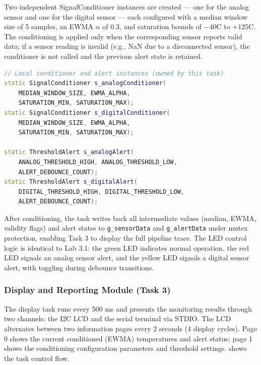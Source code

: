 Two independent SignalConditioner instances are created --- one for the analog sensor and one for the digital sensor --- each configured with a median window size of 5 samples, an EWMA $\alpha$ of 0.3, and saturation bounds of $-40$\textdegree C to $+125$\textdegree C. The conditioning is applied only when the corresponding sensor reports valid data; if a sensor reading is invalid (e.g., NaN due to a disconnected sensor), the conditioner is not called and the previous alert state is retained.

\begin{lstlisting}[language=C++, caption=Conditioning task --- pipeline and alert application (excerpt), label=lst:task_conditioning_excerpt]
// Local conditioner and alert instances (owned by this task)
static SignalConditioner s_analogConditioner(
    MEDIAN_WINDOW_SIZE, EWMA_ALPHA,
    SATURATION_MIN, SATURATION_MAX);
static SignalConditioner s_digitalConditioner(
    MEDIAN_WINDOW_SIZE, EWMA_ALPHA,
    SATURATION_MIN, SATURATION_MAX);

static ThresholdAlert s_analogAlert(
    ANALOG_THRESHOLD_HIGH, ANALOG_THRESHOLD_LOW,
    ALERT_DEBOUNCE_COUNT);
static ThresholdAlert s_digitalAlert(
    DIGITAL_THRESHOLD_HIGH, DIGITAL_THRESHOLD_LOW,
    ALERT_DEBOUNCE_COUNT);
\end{lstlisting}

After conditioning, the task writes back all intermediate values (median, EWMA, validity flags) and alert states to \texttt{g\_sensorData} and \texttt{g\_alertData} under mutex protection, enabling Task 3 to display the full pipeline trace. The LED control logic is identical to Lab 3.1: the green LED indicates normal operation, the red LED signals an analog sensor alert, and the yellow LED signals a digital sensor alert, with toggling during debounce transitions.

\subsubsection{Display and Reporting Module (Task 3)}

The display task runs every 500 ms and presents the monitoring results through two channels: the I2C LCD and the serial terminal via STDIO. The LCD alternates between two information pages every 2 seconds (4 display cycles). Page 0 shows the current conditioned (EWMA) temperatures and alert status; page 1 shows the conditioning configuration parameters and threshold settings.  shows the task control flow.

